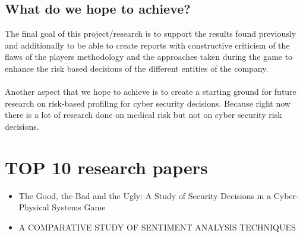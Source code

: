 \documentclass[9pt]{article}
\begin{document}
\subsection{What do we hope to achieve?}
The final goal of this project/research is to support the results found previously and additionally to be able to create reports with constructive criticism of the flaws of the players methodology and the approaches taken during the game to enhance the risk based decisions of the different entities of the company.
\\\\
Another aspect that we hope to achieve is to create a starting ground for future research on risk-based profiling for cyber security decisions. Because right now there is a lot of research done on medical risk but not on cyber security risk decisions.

\section{TOP 10 research papers}
\begin{itemize}
\item The Good, the Bad and the Ugly: A Study of Security Decisions in a Cyber-Physical Systems Game \cite{DnD}
\item A COMPARATIVE STUDY OF SENTIMENT ANALYSIS TECHNIQUES \cite{sentiment analysis}
\end{itemize}
\end{document}
